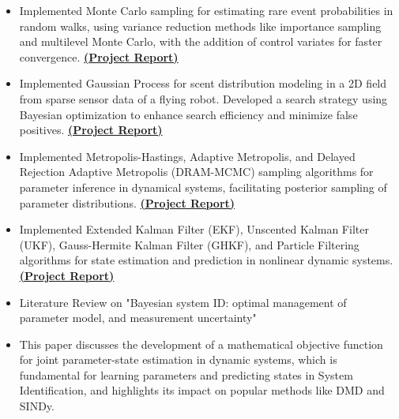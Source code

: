 \documentclass[10pt,a4paper,ragged2e,withhyper]{altacv}
\begin{document}
\begin{itemize}
    \item  Implemented Monte Carlo sampling for estimating rare event probabilities in random walks, using variance reduction methods like importance sampling and multilevel Monte Carlo, with the addition of control variates for faster convergence. \href{https://drive.google.com/file/d/1Zj1cKTC8zAlYv7HGjWjmpgrZB7GvdGne/view?usp=drive_link}{\textbf{(Project Report)}}
    \item Implemented Gaussian Process for scent distribution modeling in a 2D field from sparse sensor data of a flying robot. Developed a search strategy using Bayesian optimization to enhance search efficiency and minimize false positives. \href{https://drive.google.com/file/d/1rmVl7ab2_pvmfXvd2gHSURzPaVzqsEAP/view?usp=drive_link}{\textbf{(Project Report)}}
    \item  Implemented Metropolis-Hastings, Adaptive Metropolis, and Delayed Rejection Adaptive Metropolis (DRAM-MCMC) sampling algorithms for parameter inference in dynamical systems, facilitating posterior sampling of parameter distributions. \href{https://drive.google.com/file/d/1U3EeO3B7XSDwNVYHuw6a2UAFkQemIKku/view?usp=drive_link}{\textbf{(Project Report)}}
    \item  Implemented Extended Kalman Filter (EKF), Unscented Kalman Filter (UKF), Gauss-Hermite Kalman Filter (GHKF), and Particle Filtering algorithms for state estimation and prediction in nonlinear dynamic systems. \href{https://drive.google.com/file/d/1JPkWKbcHBsgtdJ1h-xOj_W0QmosTLNj2/view?usp=drive_link}{\textbf{(Project Report)}}
\end{itemize}


\begin{itemize}
    \item Literature Review on "Bayesian system ID: optimal management of parameter model, and measurement uncertainty"
    \item This paper discusses the development of a mathematical objective function for joint parameter-state estimation in dynamic systems, which is fundamental for learning parameters and predicting states in System Identification, and highlights its impact on popular methods like DMD and SINDy.
\end{itemize}
\end{document}

